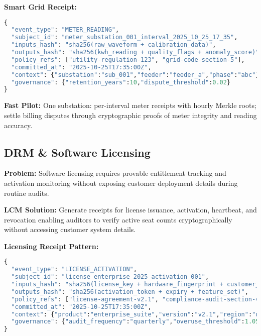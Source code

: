 \documentclass[12pt,a4paper]{article}
\begin{document}
\begin{technicalbox}
\textbf{Smart Grid Receipt:}
\begin{lstlisting}[language=Python, caption=Smart Grid Metering Receipt]
{
  "event_type": "METER_READING",
  "subject_id": "meter_substation_001_interval_2025_10_25_17_35",
  "inputs_hash": "sha256(raw_waveform + calibration_data)",
  "outputs_hash": "sha256(kwh_reading + quality_flags + anomaly_score)",
  "policy_refs": ["utility-regulation-123", "grid-code-section-5"],
  "committed_at": "2025-10-25T17:35:00Z",
  "context": {"substation":"sub_001","feeder":"feeder_a","phase":"abc"},
  "governance": {"retention_years":10,"dispute_threshold":0.02}
}
\end{lstlisting}
\end{technicalbox}

\textbf{Fast Pilot:} One substation: per-interval meter receipts with hourly Merkle roots; settle billing disputes through cryptographic proofs of meter integrity and reading accuracy.

\subsection{DRM \& Software Licensing}

\textbf{Problem:} Software licensing requires provable entitlement tracking and activation monitoring without exposing customer deployment details during routine audits.

\textbf{LCM Solution:} Generate receipts for license issuance, activation, heartbeat, and revocation enabling auditors to verify active seat counts cryptographically without accessing customer system details.

\begin{technicalbox}
\textbf{Licensing Receipt Pattern:}
\begin{lstlisting}[language=Python, caption=Software License Receipt]
{
  "event_type": "LICENSE_ACTIVATION",
  "subject_id": "license_enterprise_2025_activation_001",
  "inputs_hash": "sha256(license_key + hardware_fingerprint + customer_id)",
  "outputs_hash": "sha256(activation_token + expiry + feature_set)",
  "policy_refs": ["license-agreement-v2.1", "compliance-audit-section-4"],
  "committed_at": "2025-10-25T17:35:00Z",
  "context": {"product":"enterprise_suite","version":"v2.1","region":"us"},
  "governance": {"audit_frequency":"quarterly","overuse_threshold":1.05}
}
\end{lstlisting}
\end{technicalbox}
\end{document}
